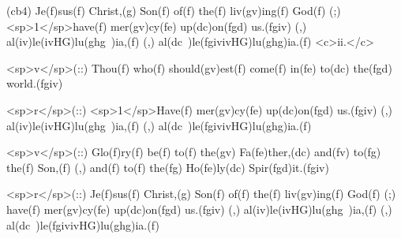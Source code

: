 (cb4) Je(f)sus(f) Christ,(g) Son(f) of(f) the(f) liv(gv)ing(f) God(f) (;) <sp>1</sp>have(f) mer(gv)cy(fe) up(dc)on(fgd) us.(fgiv) (,) al(iv)le(ivHG)lu(ghg~)ia,(f) (,) al(dc~)le(fgivivHG)lu(ghg)ia.(f) <c>ii.</c>

<sp>v</sp>(::) Thou(f) who(f) should(gv)est(f) come(f) in(fe) to(dc) the(fgd) world.(fgiv)

<sp>r</sp>(::) <sp>1</sp>Have(f) mer(gv)cy(fe) up(dc)on(fgd) us.(fgiv) (,) al(iv)le(ivHG)lu(ghg~)ia,(f) (,) al(dc~)le(fgivivHG)lu(ghg)ia.(f)

<sp>v</sp>(::) Glo(f)ry(f) be(f) to(f) the(gv) Fa(fe)ther,(dc) and(fv) to(fg) the(f) Son,(f) (,) and(f) to(f) the(fg) Ho(fe)ly(dc) Spir(fgd)it.(fgiv) 

<sp>r</sp>(::) Je(f)sus(f) Christ,(g) Son(f) of(f) the(f) liv(gv)ing(f) God(f) (;) have(f) mer(gv)cy(fe) up(dc)on(fgd) us.(fgiv) (,) al(iv)le(ivHG)lu(ghg~)ia,(f) (,) al(dc~)le(fgivivHG)lu(ghg)ia.(f)